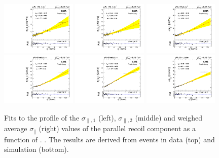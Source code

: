\begin{figure}[htb!]
 \centering
 \includegraphics[width=0.32\textwidth]{Figures/WBoson/Analysis/Correction/Recoil/RecoilFitsqT/Data/fitPFu1sigma1.pdf}
 \includegraphics[width=0.32\textwidth]{Figures/WBoson/Analysis/Correction/Recoil/RecoilFitsqT/Data/fitPFu1sigma2.pdf}
 \includegraphics[width=0.32\textwidth]{Figures/WBoson/Analysis/Correction/Recoil/RecoilFitsqT/Data/fitPFu1sigma.pdf} \\
 \includegraphics[width=0.32\textwidth]{Figures/WBoson/Analysis/Correction/Recoil/RecoilFitsqT/MC/fitPFu1sigma1.pdf}
 \includegraphics[width=0.32\textwidth]{Figures/WBoson/Analysis/Correction/Recoil/RecoilFitsqT/MC/fitPFu1sigma2.pdf}
 \includegraphics[width=0.32\textwidth]{Figures/WBoson/Analysis/Correction/Recoil/RecoilFitsqT/MC/fitPFu1sigma.pdf}
 \caption{Fits to the profile of the $\sigma_{\parallel,1}$ (left), $\sigma_{\parallel,2}$ (middle) and weighed average $\sigma_{\parallel}$ (right) values of the parallel recoil component as a function of \qtZ. . The results are derived from \ZToMuMu events in data (top) and simulation (bottom).}
 \label{fig:figU1RecoilResolutionFit}
\end{figure}

